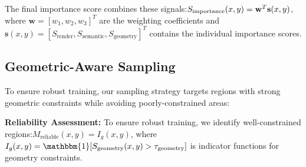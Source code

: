 \documentclass{article}
\begin{document}
  
  
  The final importance score combines these signals:$S_{\text{importance}}(x,y) \\ = \mathbf{w}^T \mathbf{s}(x,y)$,
  where $\mathbf{w} = [w_1, w_2, w_3]^T$ are the weighting coefficients and $\mathbf{s}(x,y) = [S_{\text{render}}, S_{\text{semantic}}, S_{\text{geometry}}]^T$ contains the individual importance scores.
  
  \subsection{Geometric-Aware Sampling}
  \label{subsec:caas}
  To ensure robust training, our sampling strategy targets regions with strong geometric constraints while avoiding poorly-constrained areas:
  
  
  \noindent\textbf{Reliability Assessment:} To ensure robust training, we identify well-constrained regions:$M_{\text{reliable}}(x,y) = I_g(x,y)$,
    where $I_g(x,y) = \mathbbm{1}[S_{\text{geometry}}(x,y) > \tau_{\text{geometry}}]$ is indicator functions for geometry constraints.
  
\end{document}
